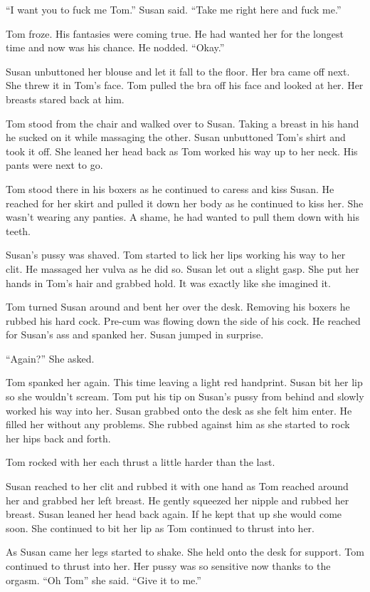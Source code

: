 “I want you to fuck me Tom.” Susan said. “Take me right here and fuck me.”

Tom froze. His fantasies were coming true. He had wanted her for the longest time and now was his chance. He nodded. “Okay.”

Susan unbuttoned her blouse and let it fall to the floor. Her bra came off next. She threw it in Tom’s face. Tom pulled the bra off his face and looked at her. Her breasts stared back at him.

Tom stood from the chair and walked over to Susan. Taking a breast in his hand he sucked on it while massaging the other. Susan unbuttoned Tom’s shirt and took it off. She leaned her head back as Tom worked his way up to her neck. His pants were next to go.

Tom stood there in his boxers as he continued to caress and kiss Susan. He reached for her skirt and pulled it down her body as he continued to kiss her. She wasn’t wearing any panties. A shame, he had wanted to pull them down with his teeth.

Susan’s pussy was shaved. Tom started to lick her lips working his way to her clit. He massaged her vulva as he did so. Susan let out a slight gasp. She put her hands in Tom’s hair and grabbed hold. It was exactly like she imagined it.

Tom turned Susan around and bent her over the desk. Removing his boxers he rubbed his hard cock. Pre-cum was flowing down the side of his cock. He reached for Susan’s ass and spanked her. Susan jumped in surprise.

“Again?” She asked.

Tom spanked her again. This time leaving a light red handprint. Susan bit her lip so she wouldn’t scream. Tom put his tip on Susan’s pussy from behind and slowly worked his way into her. Susan grabbed onto the desk as she felt him enter. He filled her without any problems. She rubbed against him as she started to rock her hips back and forth.

Tom rocked with her each thrust a little harder than the last.

Susan reached to her clit and rubbed it with one hand as Tom reached around her and grabbed her left breast. He gently squeezed her nipple and rubbed her breast. Susan leaned her head back again. If he kept that up she would come soon. She continued to bit her lip as Tom continued to thrust into her.

As Susan came her legs started to shake. She held onto the desk for support. Tom continued to thrust into her. Her pussy was so sensitive now thanks to the orgasm. “Oh Tom” she said. “Give it to me.”


